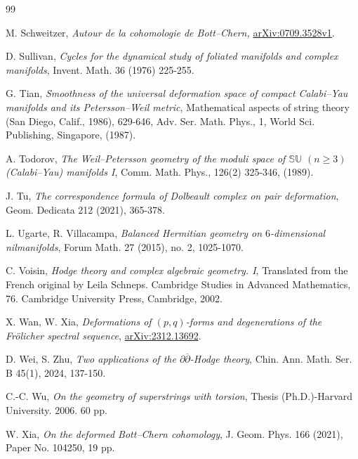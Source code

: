 \documentclass[12pt]{amsart}
\numberwithin{equation}{section}
\theoremstyle{definition}
\theoremstyle{definition}
\theoremstyle{definition}
\renewcommand{\1}{\mathsf{1}}
\renewcommand{\>}{\rightarrow}
\newcommand{\p}{\partial}
\newcommand{\bp}{\overline\partial}
\def\p{\partial}
\theoremstyle{plain} %
\theoremstyle{plain} %
\theoremstyle{plain} %
\begin{document}
\begin{thebibliography}{99}
		
		
		 M. Schweitzer,
		\newblock \textit{Autour de la cohomologie de Bott--Chern,}
		\newblock \href{http://arxiv.org/abs/0709.3528v1}{arXiv:0709.3528v1}.
		
		
		 D. Sullivan,
		\newblock \textit{Cycles for the dynamical study of foliated manifolds and complex
			manifolds},
		\newblock Invent. Math. {36} (1976) 225-255.
		
		
		 G. Tian,
		\newblock \textit{Smoothness of the universal deformation space
			of compact Calabi--Yau manifolds and its Petersson--Weil metric},
		\newblock Mathematical aspects of string theory (San Diego, Calif., 1986),
		629-646, Adv. Ser. Math. Phys., 1, World Sci. Publishing, Singapore,
		(1987).
		
		 A. Todorov,
		\newblock \textit{The Weil--Petersson geometry of the moduli
			space of $\mathbb{SU}$ {$(n\geq3)$} (Calabi--Yau) manifolds I},
		\newblock Comm. Math. Phys., {126(2)} 325-346, (1989).
		
		 J. Tu, \newblock\textit{The correspondence formula of Dolbeault complex on pair deformation},
		\newblock Geom. Dedicata 212 (2021), 365-378.
		
		 L. Ugarte, R. Villacampa,
		\newblock \textit{Balanced Hermitian geometry on $6$-dimensional nilmanifolds},
		\newblock Forum Math. {27} (2015), no. 2, 1025-1070.
		
		 C. Voisin,
		\newblock \textit{Hodge theory and complex algebraic geometry. I},
		\newblock Translated from the French original by Leila Schneps.
		Cambridge Studies in Advanced Mathematics, 76. Cambridge University
		Press, Cambridge, 2002.
		
		 X. Wan, W. Xia,  \textit{Deformations of $(p,q)$-forms and degenerations of the Fr\"olicher spectral sequence}, \href{https://arxiv.org/abs/2312.13692}{arXiv:2312.13692}.
		
		
		 D. Wei, S. Zhu, \newblock \textit{Two applications of the $\p\bp$-Hodge theory}, \newblock
		Chin. Ann. Math. Ser. B 45(1), 2024, 137-150.
		
		 C.-C. Wu,
		\newblock \textit{On the geometry of superstrings with torsion},
		\newblock Thesis (Ph.D.)-Harvard University. 2006. 60 pp.
		
		
		
		 W. Xia, \textit{On the deformed Bott--Chern cohomology},
		\newblock J. Geom. Phys. 166 (2021), Paper No. 104250, 19 pp.
		

\end{thebibliography}
\end{document}
